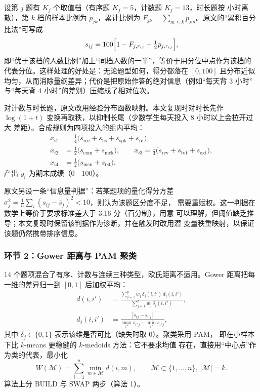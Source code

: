 设第 $j$ 题有 $K_j$ 个取值档（有序题 $K_j=5$，计数题 $K_j=13$，时长题按
小时离散），第 $k$ 档的样本比例为 $p_{jk}$，累计比例为
$F_{jk}=\sum_{m\le k}p_{jm}$。原文的“累积百分比法”可写成
\begin{equation}
s_{ij}=100\Bigl[1-F_{j,r_{ij}}+\tfrac12 p_{j,r_{ij}}\Bigr],
\label{eq:quant}
\end{equation}
即“优于该档的人数比例”加上“同档人数的一半”，等价于用分位中点作为该档的
代表分位。这样处理的好处是：无论题型如何，得分都落在 $[0,100]$ 且分布近似
均匀，从而消除量纲差异；代价是把原始作答的绝对信息（例如“每天背 3 小时”
与“每天背 4 小时”的差别）压缩成了相对位次。

对计数与时长题，原文改用经验分布函数映射。本文复现时对时长先作
$\log(1+t)$ 变换再取秩，以抑制长尾（少数学生每天投入 8 小时以上会拉开过大
差距）。合成规则为四项投入的组内平均：
\begin{equation}
\begin{aligned}
x_{i1}&=\tfrac14\bigl(s_{\mathrm{rec}}+s_{\mathrm{lis}}+s_{\mathrm{spk}}+s_{\mathrm{rd}}\bigr),\\
x_{i2}&=\tfrac12\bigl(s_{\mathrm{exm}}+s_{\mathrm{mck}}\bigr),\qquad
x_{i3}=\tfrac13\bigl(s_{\mathrm{rev}}+s_{\mathrm{tut}}+s_{\mathrm{ext}}\bigr),\\
x_{i4}&=\tfrac12\bigl(s_{\mathrm{men}}+s_{\mathrm{rst}}\bigr),
\end{aligned}
\label{eq:composite}
\end{equation}
产出 $y_i$ 为期末成绩（0—100）。

原文另设一条“信息量判据”：若某题项的量化得分方差
$\sigma_j^2=\frac1n\sum_i(s_{ij}-\bar s_j)^2<10$，则认为该题区分度不足，
需要重赋权。这一判据在数学上等价于要求标准差大于 3.16 分（百分制），用意
可以理解，但阈值缺乏推导；本文复现时保留该判据作为诊断，并在触发时改用潜
变量秩重映射，以保证该题仍然携带排序信息。

\subsubsection{环节 2：Gower 距离与 PAM 聚类}

14 个题项混合了有序、计数与连续三种类型，欧氏距离不适用。Gower 距离把每
一维的差异归一到 $[0,1]$ 后加权平均：
\begin{equation}
\begin{aligned}
d(i,i')&=\frac{\sum_{j=1}^{p}w_j\,\delta_{j}(i,i')\,d_j(i,i')}
{\sum_{j=1}^{p}w_j\,\delta_j(i,i')},\\
d_j(i,i')&=\frac{|s_{ij}-s_{i'j}|}{\max_{i''}s_{i''j}-\min_{i''}s_{i''j}},
\end{aligned}
\label{eq:gower}
\end{equation}
其中 $\delta_j\in\{0,1\}$ 表示该维是否可比（缺失时取 0）。聚类采用 PAM，
即在小样本下比 $k$-means 更稳健的 $k$-medoids 方法：它不要求均值
存在，直接用“中心点”作为类的代表，最小化
\begin{equation}
W(\mathcal{M})=\sum_{i=1}^{n}\min_{m\in\mathcal{M}}d(i,m),
\qquad \mathcal{M}\subset\{1,\dots,n\},\ |\mathcal{M}|=k .
\label{eq:pam}
\end{equation}
算法上分 BUILD 与 SWAP 两步（算法 1）。

